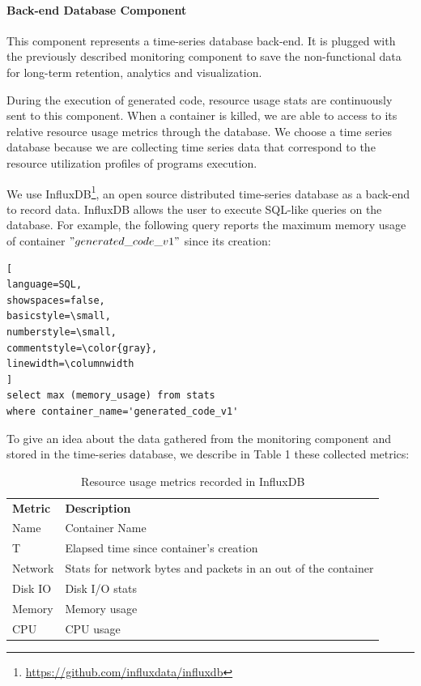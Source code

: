 \paragraph{Back-end Database Component}
This component represents a time-series database back-end. It is plugged with the previously described monitoring component to save the non-functional data for long-term retention, analytics and visualization. 

During the execution of generated code, resource usage stats are continuously sent to this component. When a container is killed, we are able to access to its relative resource usage metrics through the database. We choose a time series database because we are collecting time series data that correspond to the resource utilization profiles of programs execution.

We use InfluxDB\footnote{\url{https://github.com/influxdata/influxdb}}, an open source distributed time-series database as a back-end to record data. InfluxDB allows the user to execute SQL-like queries on the database. For example, the following query reports the maximum memory usage of container $"generated\_code\_v1"$ since its creation:

\begin{lstlisting}[
language=SQL,
showspaces=false,
basicstyle=\small,
numberstyle=\small,
commentstyle=\color{gray},
linewidth=\columnwidth
]
select max (memory_usage) from stats 
where container_name='generated_code_v1'
\end{lstlisting}
To give an idea about the data gathered from the monitoring component and stored in the time-series database, we describe in Table 1 these collected metrics:
\begin{table}[h]
	\begin{center}
		\begin{tabular}{|p{1cm}|p{6.6cm}|}
			\hline
			\textbf{Metric} & \textbf{Description} \\
			\hhline{|=|=|}	
			Name & Container Name \\\hline
			
			T & Elapsed time since container's creation \\\hline
			
			Network  &  Stats for network bytes and packets in an out of the container \\\hline
			
			Disk IO &  Disk I/O stats \\\hline
			
			Memory  &  Memory usage \\\hline
			
			CPU &  CPU usage \\
			\hline
			
		\end{tabular}
		
	\end{center}
	\caption {Resource usage metrics recorded in InfluxDB}
\end{table}

